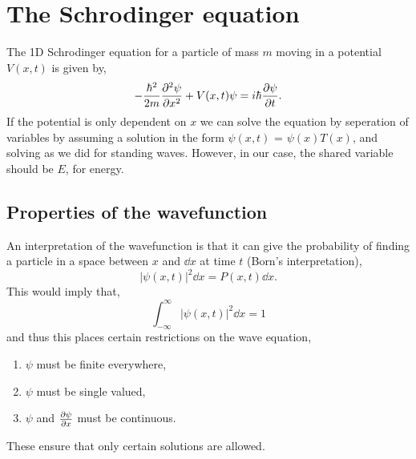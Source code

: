 \documentclass{book}
\begin{document}
\chapter{The Schrodinger equation}
The 1D Schrodinger equation for a particle of mass $m$ moving in a potential $V(x,t)$ is given by,
\begin{equation}
	-\frac{\hbar^2}{2m}\pdv[2]{\psi}{x} + V(x,t)\psi = i\hbar \pdv{\psi}{t}.
\end{equation}
If the potential is only dependent on $x$ we can solve the equation by seperation of variables by assuming a solution in the form $\psi(x,t)$ = $\psi(x)T(x)$, and solving as we did for standing waves. However, in our case, the shared variable should be $E$, for energy. 
\section{Properties of the wavefunction}
An interpretation of the wavefunction is that it can give the probability of finding a particle in a space between $x$ and $\dd{x}$ at time $t$ (Born's interpretation),
\begin{equation}
	|\psi(x,t)|^2\dd{x}= P(x,t)\dd{x}.
\end{equation}
This would imply that,
\begin{equation}
	\int_{-\infty}^{\infty}|\psi(x,t)|^2\dd{x} = 1 \label{probablility}
\end{equation}
and thus this places certain restrictions on the wave equation,
\begin{enumerate}
	\item $\psi$ must be finite everywhere,
	\item $\psi$ must be single valued,
	\item $\psi$ and $\pdv{\psi}{x}$ must be continuous. 
\end{enumerate}
These ensure that only certain solutions are allowed.
\end{document}
